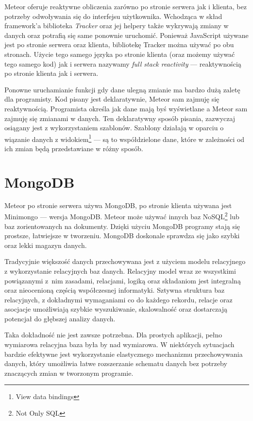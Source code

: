 Meteor oferuje reaktywne obliczenia zarówno po stronie serwera jak i klienta, bez potrzeby odwoływania się do interfejsu użytkownika. Wchodząca w skład framework'a biblioteka \emph{Tracker} oraz jej helpery także wykrywają zmiany w danych oraz potrafią się same ponownie uruchomić. Ponieważ JavaScript używane jest po stronie serwera oraz klienta, bibliotekę Tracker można używać po obu stronach. Użycie tego samego języka po stronie klienta (oraz możemy używać tego samego kod) jak i serwera nazywamy \emph{full stack reactivity} --- reaktywnością po stronie klienta jak i serwera.

Ponowne uruchamianie funkcji gdy dane ulegną zmianie ma bardzo dużą zaletę dla programisty. Kod pisany jest deklaratywnie, Meteor sam zajmuję się reaktywnością. Programista określa jak dane mają byś wyświetlane a Meteor sam zajmuję się zmianami w danych. Ten deklaratywny sposób pisania, zazwyczaj osiągany jest z wykorzystaniem szablonów. Szablony działają w oparciu o wiązanie danych z widokiem\footnote{View data bindings} --- są to współdzielone dane, które w zależności od ich zmian będą przedstawiane w różny sposób\cite{strack15}. 

\section{MongoDB}

Meteor po stronie serwera używa MongoDB, po stronie klienta używana jest Minimongo --- wersja MongoDB. Meteor może używać innych baz NoSQL\footnote{Not Only SQL} lub baz zorientowanych na dokumenty. Dzięki użyciu MongoDB programy stają się prostsze, łatwiejsze w tworzeniu. MongoDB doskonale sprawdza się jako szybki oraz lekki magazyn danych.

Tradycyjnie większość danych przechowywana jest z użyciem modelu relacyjnego z wykorzystanie relacyjnych baz danych. Relacyjny model wraz ze wszystkimi powiązanymi z~nim zasadami, relacjami, logiką oraz składaniom jest integralną oraz nieocenioną częścią współczesnej informatyki. Sztywna struktura baz relacyjnych, z dokładnymi wymaganiami co do każdego rekordu, relacje oraz asocjacje umożliwiają szybkie wyszukiwanie, skalowalność oraz dostarczają potencjał do głębszej analizy danych.

Taka dokładność nie jest zawsze potrzebna. Dla prostych aplikacji, pełno wymiarowa relacyjna baza była by nad wymiarowa. W niektórych sytuacjach bardzie efektywne jest wykorzystanie elastycznego mechanizmu przechowywania danych, który umożliwia łatwe rozszerzanie schematu danych bez potrzeby znaczących zmian w tworzonym programie.


